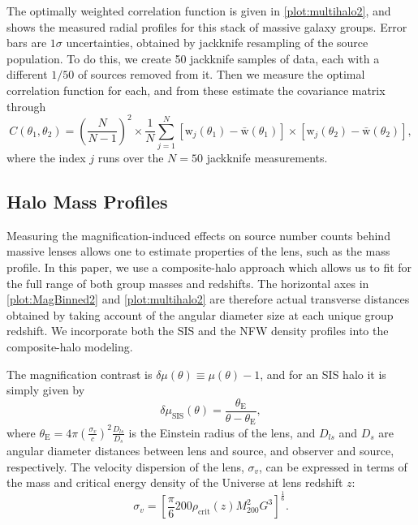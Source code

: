 The optimally weighted correlation function is given in \autoref{plot:multihalo2}, and shows the measured radial profiles for this stack of massive galaxy groups. Error bars are $1 \sigma$ uncertainties, obtained by jackknife resampling of the source population.  To do this, we create 50 jackknife samples of data, each with a different $1/50$ of sources removed from it. Then we measure the optimal correlation function for each, and from these estimate the covariance matrix through
\begin{equation}
C(\theta_1, \theta_2)= \left( \frac{N}{N-1} \right)^2 \times \frac{1}{N} \sum_{j=1}^N [\mathrm{w}_j(\theta_1)-\bar{\mathrm{w}}(\theta_1)] \times [\mathrm{w}_j(\theta_2)-\bar{\mathrm{w}}(\theta_2)],
\end{equation}
where the index $j$ runs over the $N=50$ jackknife measurements.

\subsection{Halo Mass Profiles}
\label{sec:halomasses}
Measuring the magnification-induced effects on source number counts behind massive lenses allows one to estimate properties of the lens, such as the mass profile. In this paper, we use a composite-halo approach which allows us to fit for the full range of both group masses and redshifts. The horizontal axes in \autoref{plot:MagBinned2} and \autoref{plot:multihalo2} are therefore actual transverse distances obtained by taking account of the angular diameter size at each unique group redshift. We incorporate both the \ac{SIS} and the \ac{NFW} \citep{nfw97} density profiles into the composite-halo modeling.

The magnification contrast is $\delta\mu(\theta) \equiv \mu(\theta) -1$, and for an \ac{SIS} halo it is simply given by 
\begin{equation}
\delta \mu_{\text{SIS}}(\theta)=\frac{\theta_{\text{E}}}{\theta-\theta_{\text{E}}},
\end{equation}
where $\theta_{\text{E}}=4\pi(\frac{\sigma_v}{c})^2\frac{D_{ls}}{D_s}$ is the Einstein radius of the lens, and $D_{ls}$ and $D_s$ are angular diameter distances between lens and source, and observer and source, respectively. The velocity dispersion of the lens, $\sigma_v$, can be expressed in terms of the mass and critical energy density of the Universe at lens redshift $z$:
\begin{equation}
\sigma_v=\left[ \frac{\pi}{6}200\rho_{\text{crit}}(z)M_{200}^2 G^3 \right]^\frac{1}{6} .
\end{equation}

